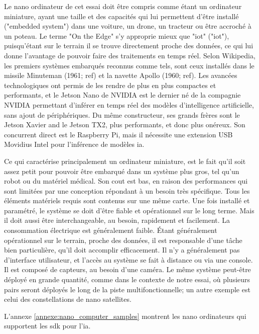 ﻿\par Le nano ordinateur de cet essai doit être compris comme étant un ordinateur miniature, ayant une taille et des capacités qui lui permettent d'être installé ("embedded system") dans une voiture, un drone, un tracteur ou être accroché à un poteau. Le terme "On the Edge" s'y approprie mieux que "\acrshort{iot}" ("\acrlong{iot}"), puisqu'étant sur le terrain il se trouve directement proche des données, ce qui lui donne l'avantage de pouvoir faire des traitements en temps réel. Selon Wikipedia, les premiers systèmes embarqués reconnus comme tels, sont ceux installés dans le missile Minuteman (1961; ref) et la navette Apollo (1960; ref). Les avancées technologiques ont permis de les rendre de plus en plus compactes et performants, et le Jetson Nano de NVIDIA est le dernier né de la compagnie NVIDIA permettant d'inférer en temps réel des modèles d'intelligence artificielle, sans ajout de périphériques. Du même constructeur, ses grands frères sont le Jetson Xavier and le Jetson TX2, plus performants, et donc plus onéreux. Son concurrent direct est le Raspberry Pi, mais il nécessite une extension USB Movidius Intel pour l'inférence de modèles \acrshort{ia}. 
\par Ce qui caractérise principalement un ordinateur miniature, est le fait qu'il soit assez petit pour pouvoir être embarqué dans un système plus gros, tel qu'un robot ou du matériel médical. Son cout est bas, en raison des performances qui sont limitées par une conception répondant à un besoin très spécifique. Tous les éléments matériels requis sont contenus sur une même carte.  Une fois installé et paramétré, le système se doit d'être fiable et opérationnel sur le long terme. Mais il doit aussi être interchangeable, au besoin, rapidement et facilement. La consommation électrique est généralement faible. Étant généralement opérationnel sur le terrain, proche des données, il est responsable d'une tâche bien particulière, qu'il doit accomplir efficacement. Il n'y a généralement pas d'interface utilisateur, et l'accès au système se fait à distance ou via une console. Il est composé de capteurs, au besoin d'une caméra. Le même système peut-être déployé en grande quantité, comme dans le contexte de notre essai, où plusieurs pairs seront déployés le long de la piste multifonctionnelle; un autre exemple est celui des constellations de nano satellites.
\par L'annexe \ref{annexe:nano_computer_samples} montrent les nano ordinateurs qui supportent les \acrshort{sdk} pour l'\acrshort{ia}.
